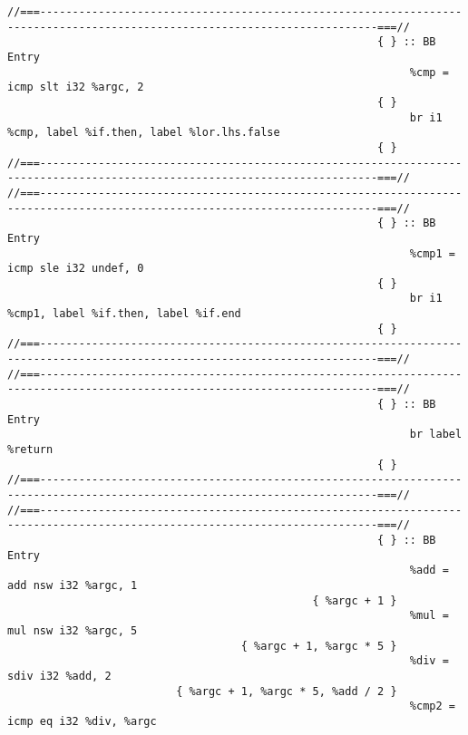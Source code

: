 \begin{verbatim}
//===--------------------------------------------------------------------------------------------------------------------------===//
                                                         { } :: BB Entry
                                                              %cmp = icmp slt i32 %argc, 2
                                                         { }
                                                              br i1 %cmp, label %if.then, label %lor.lhs.false
                                                         { }
//===--------------------------------------------------------------------------------------------------------------------------===//
//===--------------------------------------------------------------------------------------------------------------------------===//
                                                         { } :: BB Entry
                                                              %cmp1 = icmp sle i32 undef, 0
                                                         { }
                                                              br i1 %cmp1, label %if.then, label %if.end
                                                         { }
//===--------------------------------------------------------------------------------------------------------------------------===//
//===--------------------------------------------------------------------------------------------------------------------------===//
                                                         { } :: BB Entry
                                                              br label %return
                                                         { }
//===--------------------------------------------------------------------------------------------------------------------------===//
//===--------------------------------------------------------------------------------------------------------------------------===//
                                                         { } :: BB Entry
                                                              %add = add nsw i32 %argc, 1
                                               { %argc + 1 }
                                                              %mul = mul nsw i32 %argc, 5
                                    { %argc + 1, %argc * 5 }
                                                              %div = sdiv i32 %add, 2
                          { %argc + 1, %argc * 5, %add / 2 }
                                                              %cmp2 = icmp eq i32 %div, %argc

\end{verbatim}
